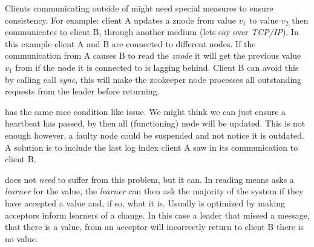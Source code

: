 Clients communicating outside of \zookeeper{} might need special measures to ensure consistency. For example: client A updates a znode from value $v_1$ to value $v_2$ then communicates to client B, through another medium (lets say over \textsl{TCP/IP}). In this example client A and B are connected to different \zookeeper{} nodes. If the communication from A causes B to read the \textsl{znode} it will get the previous value $v_1$ from \zookeeper{} if the node it is connected to is lagging behind. Client B can avoid this by calling call \textit{sync}, this will make the zookeeper node processes all outstanding requests from the leader before returning.

\raft{} has the same race condition like issue. We might think we can just ensure a heartbeat has passed, by then all (functioning) node will be updated. This is not enough however, a faulty node could be suspended and not notice it is outdated. A solution is to include the last log index client A saw in its communication to client B. 

\paxos{} does not \textit{need} to suffer from this problem, but it can. In \paxos{} reading means asks a \textit{learner} for the value, the \textit{learner} can then ask the majority of the system if they have accepted a value and, if so, what it is. Usually \paxos{} is optimized by making acceptors inform learners of a change. In this case a leader that missed a message, that there is a value, from an acceptor will incorrectly return to client B there is no value.
